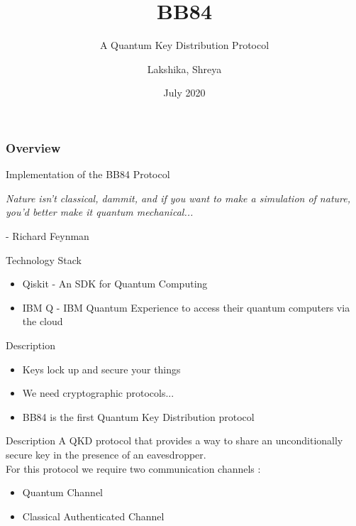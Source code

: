 \documentclass[10 pt]{beamer}
\title[BB84]{BB84}
\subtitle{A Quantum Key Distribution Protocol}
\author[Team 37]{Lakshika, Shreya}
\date{July 2020}
\begin{document}
\begin{frame}
	\titlepage
\end{frame}

\begin{frame}
	\frametitle{Overview}
	 Implementation of the BB84 Protocol
\end{frame}


\begin{frame}[standout]
    \begin{center}
        \emph{Nature isn’t classical, dammit, and if you want to make a simulation of nature, you’d better make it quantum mechanical...}
    \end{center}
    \begin{flushright}
        - Richard Feynman
    \end{flushright}
\end{frame}


\begin{frame}{Technology Stack}
	\begin{itemize}
		\item Qiskit - An SDK for Quantum Computing
		\item IBM Q - IBM Quantum Experience to access their quantum computers via the cloud
	\end{itemize}
\end{frame}

\begin{frame}{Description}
    \begin{itemize}[<+->] 
        \item Keys lock up and secure your things
        \item We need cryptographic protocols...
        \item BB84 is the first Quantum Key Distribution protocol
    \end{itemize}
\end{frame}

\begin{frame}{Description}
    A QKD protocol that provides a way to share an unconditionally secure key in the presence of an eavesdropper.\\
    For this protocol we require two communication channels : 
    \begin{itemize}[<+->]
        \item Quantum Channel 
        \item Classical Authenticated Channel
    \end{itemize}
\end{frame}
\end{document}
